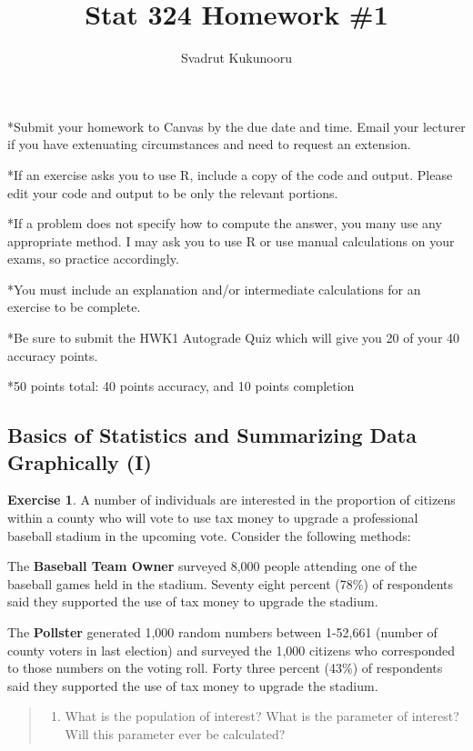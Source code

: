 \documentclass[
]{article}
\title{Stat 324 Homework \#1}
\author{Svadrut Kukunooru}
\date{}
\providecommand{\tightlist}{%
  \setlength{\itemsep}{0pt}\setlength{\parskip}{0pt}}
\begin{document}
\maketitle

*Submit your homework to Canvas by the due date and time. Email your
lecturer if you have extenuating circumstances and need to request an
extension.

*If an exercise asks you to use R, include a copy of the code and
output. Please edit your code and output to be only the relevant
portions.

*If a problem does not specify how to compute the answer, you many use
any appropriate method. I may ask you to use R or use manual
calculations on your exams, so practice accordingly.

*You must include an explanation and/or intermediate calculations for an
exercise to be complete.

*Be sure to submit the HWK1 Autograde Quiz which will give you 20 of
your 40 accuracy points.

*50 points total: 40 points accuracy, and 10 points completion

\hypertarget{basics-of-statistics-and-summarizing-data-graphically-i}{%
\subsection{Basics of Statistics and Summarizing Data Graphically
(I)}\label{basics-of-statistics-and-summarizing-data-graphically-i}}

\textbf{Exercise 1}. A number of individuals are interested in the
proportion of citizens within a county who will vote to use tax money to
upgrade a professional baseball stadium in the upcoming vote. Consider
the following methods:

The \textbf{Baseball Team Owner} surveyed 8,000 people attending one of
the baseball games held in the stadium. Seventy eight percent (78\%) of
respondents said they supported the use of tax money to upgrade the
stadium.

The \textbf{Pollster} generated 1,000 random numbers between 1-52,661
(number of county voters in last election) and surveyed the 1,000
citizens who corresponded to those numbers on the voting roll. Forty
three percent (43\%) of respondents said they supported the use of tax
money to upgrade the stadium.

\begin{quote}
\begin{enumerate}
\def\labelenumi{\alph{enumi}.}
\tightlist
\item
  What is the population of interest? What is the parameter of interest?
  Will this parameter ever be calculated?
\end{enumerate}
\end{quote}
\end{document}
